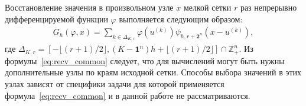 Восстановление значения в произвольном  узле $x$    мелкой сетки %
$r$ раз непрерывно дифференцируемой функции $\varphi$
выполняется следующим образом: 
\begin{gather}
  \label{eq:recv_common}
  G_h(\varphi, x) = \sum_{k\in  \Delta_{K,r}}
   \varphi(u^{(k)})
   \psi_{h, r+\mathbf{2}^n}(x-u^{(k)}),%
 \end{gather}
 где $ \Delta_{K,r}=\left[-\lfloor{(r+1)/2}\rfloor,
   (K-\mathbf{1}^n)h+\lfloor{(r+1)/2}\rfloor\right]\cap\mathbb{Z}_+^n$.
Из формулы~\eqref{eq:recv_common} следует, что для вычислений
могут быть нужны дополнительные
узлы по краям исходной сетки.
Способы выбора значений в этих узлах зависят
от специфики задачи для которой применяется формула~\eqref{eq:recv_common}  
и в данной работе не рассматриваются.

\begin{comment}

  -->Перенесено в начало!
 
Будем полагать, что $K$ узлов в которых известны значения функции $\varphi$
расположены на отрезке $[0, K-1]$ с единичным шагом ($h=1$).
Сетку с известными значениями в узлах будем называть \textit{крупной сеткой}.
Требуется вычислить значения 
в $M$ узлах,
равномерно расположенных на исходном отрезке,
где $N$ --- произвольное натуральное число.
Сетку размером $M = N(K-1) + K$ будем называть
\textit{мелкой сеткой}.
Обозначим $N^* = N+1$.
В этих обозначениях количество узлов мелкой сетки $M = N^* (K-1) + 1$.



\end{comment}



